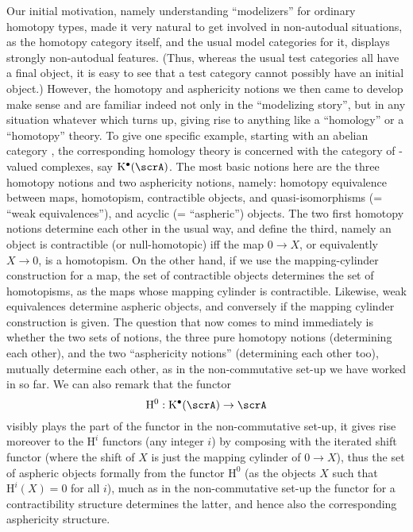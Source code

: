 Our initial motivation, namely understanding ``modelizers'' for
ordinary homotopy types, made it very natural to get involved in
non-autodual situations, as the homotopy category \Hot{} itself, and
the usual model categories for it, displays strongly non-autodual
features. (Thus, whereas the usual test categories all have a final
object, it is easy to see that a test category cannot possibly have an
initial object.) However, the homotopy and asphericity notions we then
came to develop make sense and are familiar indeed not only in the
``modelizing story'', but in any situation whatever which turns up,
giving rise to anything like a ``homology'' or a ``homotopy''
theory. To give one specific example, starting with an abelian
category \scrA, the corresponding homology theory is concerned with the
category of \scrA-valued complexes, say $\mathrm
K^\bullet(\scrA)$. The most basic notions here are the three homotopy
notions and two asphericity notions, namely: homotopy equivalence
between maps, homotopism, contractible objects, and quasi-isomorphisms
(= ``weak equivalences''), and acyclic (= ``aspheric'') objects. The
two first homotopy notions determine each other in the usual way, and
define the third, namely an object is contractible (or null-homotopic)
if{f} the map $0\to X$, or equivalently $X\to 0$, is a homotopism. On
the other hand, if we use the mapping-cylinder construction for a map,
the set of contractible objects determines the set of homotopisms, as
the maps whose mapping cylinder is contractible. Likewise, weak
equivalences determine aspheric objects, and conversely if the mapping
cylinder construction is given. The question that now comes to mind
immediately is whether the two sets of notions, the three pure
homotopy notions (determining each other), and the two ``asphericity
notions'' (determining each other too), mutually determine each
other, as in the non-commutative set-up we have worked in so far. We
can also remark that the functor
\[ \mathrm H^0 : \mathrm K^\bullet(\scrA)\to\scrA\]
visibly plays the part of the functor \piz{} in the non-commutative
set-up, it gives rise moreover to the $\mathrm H^i$ functors (any
integer $i$) by composing with the iterated shift functor (where the
shift of $X$ is just the mapping cylinder of $0\to X$),
thus the set of aspheric objects formally from the functor $\mathrm
H^0$ (as the objects $X$ such that $\mathrm H^i(X)=0$ for all $i$),
much as in the non-commutative set-up the functor \piz{} for a
contractibility structure determines the latter, and hence also the
corresponding asphericity structure.

